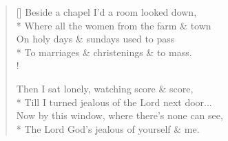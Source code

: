 \documentclass[MAIN]{subfiles}
\begin{document}
\settowidth{\versewidth}{Where all the women from the farm \& town}
\begin{verse}[\versewidth]
Beside a chapel I'd a room looked down,\\*
Where all the women from the farm \& town\\
On holy days \& sundays used to pass\\*
To marriages \& christenings \& to mass.\\!

Then I sat lonely, watching score \& score,\\*
Till I turned jealous of the Lord next door...\\
Now by this window, where there's none can see,\\*
The Lord God's jealous of yourself \& me.
\end{verse}
\end{document}
